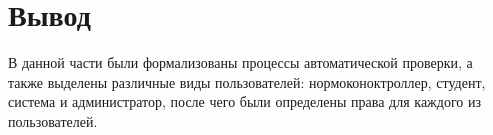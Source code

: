 \section*{Вывод}
В данной части были формализованы процессы автоматической проверки, а также выделены различные виды пользователей: нормоконоктроллер, студент, система и администратор, после чего были определены права для каждого из пользователей.




